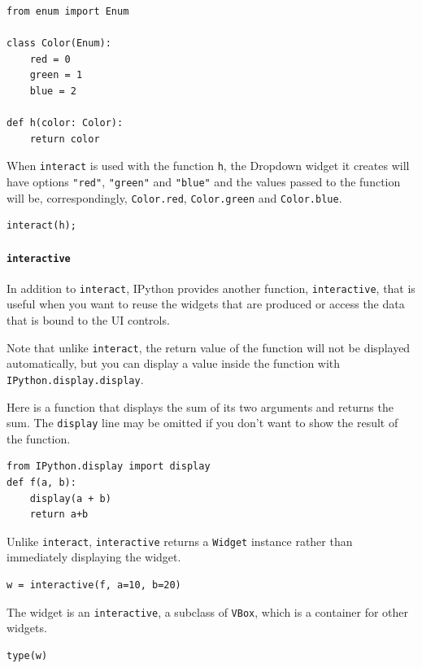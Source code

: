 \begin{verbatim}
from enum import Enum

class Color(Enum):
    red = 0
    green = 1
    blue = 2

def h(color: Color):
    return color
\end{verbatim}

When \texttt{interact} is used with the function \texttt{h}, the Dropdown widget it creates will have options \texttt{"red"}, \texttt{"green"} and \texttt{"blue"} and the values passed to the function will be, correspondingly, \texttt{Color.red}, \texttt{Color.green} and \texttt{Color.blue}.

\begin{verbatim}
interact(h);
\end{verbatim}

\paragraph{\texttt{interactive}}

In addition to \texttt{interact}, IPython provides another function, \texttt{interactive}, that is useful when you want to reuse the widgets that are produced or access the data that is bound to the UI controls.

Note that unlike \texttt{interact}, the return value of the function will not be displayed automatically, but you can display a value inside the function with \texttt{IPython.display.display}.

Here is a function that displays the sum of its two arguments and returns the sum. The \texttt{display} line may be omitted if you don't want to show the result of the function.

\begin{verbatim}
from IPython.display import display
def f(a, b):
    display(a + b)
    return a+b
\end{verbatim}

Unlike \texttt{interact}, \texttt{interactive} returns a \texttt{Widget} instance rather than immediately displaying the widget.

\begin{verbatim}
w = interactive(f, a=10, b=20)
\end{verbatim}

The widget is an \texttt{interactive}, a subclass of \texttt{VBox}, which is a container for other widgets.

\begin{verbatim}
type(w)
\end{verbatim}

